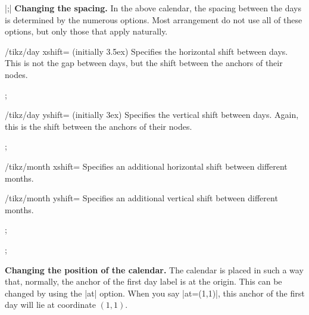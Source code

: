 \begin{command}{\calendar {}|;|}
  \medskip
  \textbf{Changing the spacing.}
  In the above calendar, the spacing between the days is determined by
  the numerous options. Most arrangement do not use all of these
  options, but only those that apply naturally.
  \begin{key}{/tikz/day xshift= (initially 3.5ex)}
    Specifies the
    horizontal shift between days. This is not the gap between days,
    but the shift between the anchors of their nodes.
\begin{codeexample}[]
\tikz \calendar[dates=2000-01-01 to 2000-01-31,week list,day xshift=3ex];  
\end{codeexample}
  \end{key}
  \begin{key}{/tikz/day yshift= (initially 3ex)}
    Specifies the
    vertical shift between days. Again, this is the shift between the
    anchors of their nodes.
\begin{codeexample}[]
\tikz \calendar[dates=2000-01-01 to 2000-01-31,week list,day yshift=2ex];  
\end{codeexample}
  \end{key}
  \begin{key}{/tikz/month xshift=}
    Specifies an additional  horizontal shift between different
    months.
  \end{key}
  \begin{key}{/tikz/month yshift=}
    Specifies an
    additional  vertical shift between different months. 
\begin{codeexample}[]
\tikz \calendar[dates=2000-01-01 to 2000-02-last,week list,
                month yshift=0pt];  
\end{codeexample}
\begin{codeexample}[]
\tikz \calendar[dates=2000-01-01 to 2000-02-last,week list,
                month yshift=1cm];  
\end{codeexample}
  \end{key}

  \medskip
  \textbf{Changing the position of the calendar.}
  The calendar is placed in such a way that, normally, the anchor of
  the first day label is at the origin. This can be changed by using
  the |at| option. When you say |at={(1,1)}|, this anchor of the first
  day will lie at coordinate $(1,1)$.


\end{command}
